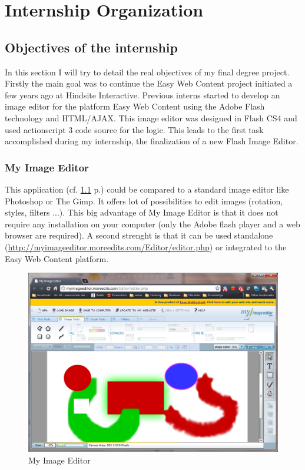 \chapter{Internship Organization}

\section{Objectives of the internship}

In this section I will try to detail the real objectives of my final degree project.
Firstly the main goal was to continue the Easy Web Content project
initiated a few years ago at Hindsite Interactive.
Previous interns started to develop an image editor for the platform Easy Web Content using the Adobe
Flash technology and HTML/AJAX. This image editor was designed in Flash CS4 and used actionscript 3 code source for the logic.
This leads to the first task accomplished during my internship, the finalization
 of a new Flash Image Editor.

\subsection{My Image Editor}

This application (cf. \ref{figure:ewc-image_editor} p.\pageref{figure:ewc-image_editor}) could be compared to a standard image editor like Photoshop or The Gimp. It offers lot of possibilities to edit images (rotation, styles, filters ...). This big advantage of My Image Editor is that it does not require any installation on your computer (only the Adobe flash player and a web browser are required). A second strenght is that it can be used standalone (\url{http://myimageeditor.moreedits.com/Editor/editor.php}) or integrated to the Easy Web Content platform.


\begin{figure}[!h]
\centering
\includegraphics[width=.80\textwidth]{img/my_image_editor.png}
\caption{My Image Editor}
\label{figure:ewc-image_editor}
\end{figure}

